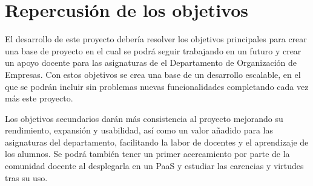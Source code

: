 \section{Repercusión de los objetivos}
El desarrollo de este proyecto debería resolver los objetivos principales para crear una base de proyecto en el cual se podrá seguir trabajando en un futuro y crear un apoyo docente para las asignaturas de el Departamento de Organización de Empresas. Con estos objetivos se crea una base de un desarrollo escalable, en el que se podrán incluir sin problemas nuevas funcionalidades completando cada vez más este proyecto.

\bigskip
Los objetivos secundarios darán más consistencia al proyecto mejorando su rendimiento, expansión y usabilidad, así como un valor añadido para las asignaturas del departamento, facilitando la labor de docentes y el aprendizaje de los alumnos. Se podrá también tener un primer acercamiento por parte de la comunidad docente al desplegarla en un PaaS y estudiar las carencias y virtudes tras su uso.


